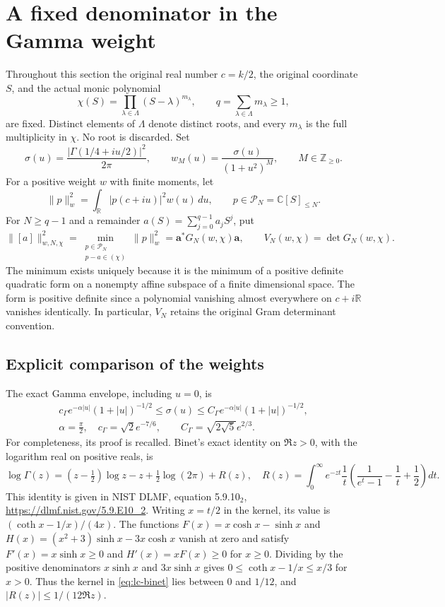\section{A fixed denominator in the Gamma weight}
\label{sec:lc-fixed-denominator}

Throughout this section the original real number $c=k/2$, the original
coordinate $S$, and the actual monic polynomial
\[
 \chi(S)=\prod_{\lambda\in\Lambda}(S-\lambda)^{m_\lambda},
 \qquad q=\sum_{\lambda\in\Lambda}m_\lambda\ge1,
\]
are fixed. Distinct elements of $\Lambda$ denote distinct roots, and every
$m_\lambda$ is the full multiplicity in $\chi$. No root is discarded. Set
\[
 \sigma(u)=\frac{|\Gamma(1/4+iu/2)|^2}{2\pi},
 \qquad w_M(u)=\frac{\sigma(u)}{(1+u^2)^M},
 \qquad M\in\mathbb Z_{\ge0}.
 \tag{LC.1}\label{eq:lc-weights}
\]
For a positive weight $w$ with finite moments, let
\[
 \|p\|_w^2=\int_{\mathbb R}|p(c+iu)|^2w(u)\,du,
 \qquad p\in\mathcal P_N=\mathbb C[S]_{\le N}.
 \tag{LC.2}\label{eq:lc-norm}
\]
For $N\ge q-1$ and a remainder $a(S)=\sum_{j=0}^{q-1}a_jS^j$, put
\[
 \|[a]\|_{w,N,\chi}^2
 =\min_{\substack{p\in\mathcal P_N\\p-a\in(\chi)}}\|p\|_w^2
 =\boldsymbol a^*G_N(w,\chi)\boldsymbol a,
 \qquad V_N(w,\chi)=\det G_N(w,\chi).
 \tag{LC.3}\label{eq:lc-quotient}
\]
The minimum exists uniquely because it is the minimum of a positive definite
quadratic form on a nonempty affine subspace of a finite dimensional space.
The form is positive definite since a polynomial vanishing almost everywhere
on $c+i\mathbb R$ vanishes identically. In particular, $V_N$ retains the
original Gram determinant convention.

\subsection{Explicit comparison of the weights}

The exact Gamma envelope, including $u=0$, is
\[
 \begin{gathered}
 c_\Gamma e^{-\alpha|u|}(1+|u|)^{-1/2}
 \le\sigma(u)\le
 C_\Gamma e^{-\alpha|u|}(1+|u|)^{-1/2},\\
 \alpha=\frac\pi2,
 \quad c_\Gamma=\sqrt2e^{-7/6},
 \qquad C_\Gamma=\sqrt{2\sqrt5}e^{2/3}.
 \end{gathered}
 \tag{LC.4}\label{eq:lc-gamma-envelope}
\]
For completeness, its proof is recalled. Binet's exact identity on $\Re z>0$,
with the logarithm real on positive reals, is
\[
 \log\Gamma(z)=(z-\tfrac12)\log z-z+\tfrac12\log(2\pi)+R(z),
 \quad
 R(z)=\int_0^\infty e^{-zt}\frac1t
 \left(\frac1{e^t-1}-\frac1t+\frac12\right)dt.
 \tag{LC.5}\label{eq:lc-binet}
\]
This identity is given in NIST DLMF, equation 5.9.10$_2$,
\url{https://dlmf.nist.gov/5.9.E10_2}.
Writing $x=t/2$ in the kernel, its value is
$(\coth x-1/x)/(4x)$. The functions
$F(x)=x\cosh x-\sinh x$ and
$H(x)=(x^2+3)\sinh x-3x\cosh x$ vanish at zero and satisfy
$F'(x)=x\sinh x\ge0$ and $H'(x)=xF(x)\ge0$ for $x\ge0$.
Dividing by the positive denominators $x\sinh x$ and $3x\sinh x$ gives
$0\le\coth x-1/x\le x/3$ for $x>0$. Thus the kernel in
\eqref{eq:lc-binet} lies between $0$ and $1/12$, and
$|R(z)|\le1/(12\Re z)$.

